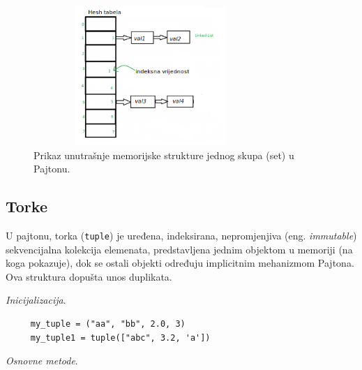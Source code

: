  	\begin{figure}[!ht]
	\centering
	\includegraphics[width=250pt,height=150pt]{slike/set_mem_organization.png}
	\caption{Prikaz unutrašnje memorijske strukture jednog skupa (set) u Pajtonu. }
\end{figure}  %

\subsection{Torke}
 
 U pajtonu, torka (\texttt{tuple}) je uređena, indeksirana, nepromjenjiva (eng. \textit{immutable}) sekvencijalna kolekcija elemenata, predstavljena jednim objektom u memoriji (na koga pokazuje), dok se ostali objekti određuju implicitnim mehanizmom Pajtona.  Ova struktura dopušta unos duplikata. 
 
 
 \textit{Inicijalizacija}.  
 
 \begin{verbatim}
 	 my_tuple = ("aa", "bb", 2.0, 3)
 	 my_tuple1 = tuple(["abc", 3.2, 'a'])
 \end{verbatim}
 
 
 \textit{Osnovne metode}. 
 
